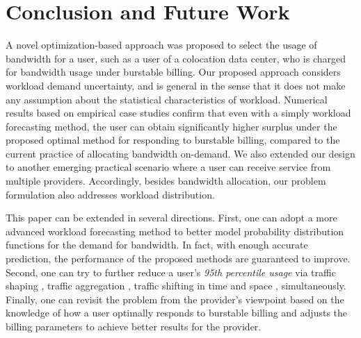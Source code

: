 \documentclass[10pt,journal,compsoc]{IEEEtran}
\begin{document}
\section{Conclusion and Future Work}\label{sec:conclusion}
A novel optimization-based approach was proposed to select the usage of bandwidth for a user, such as a user of a colocation data center, who is charged for bandwidth usage under burstable billing. Our proposed approach considers workload demand uncertainty, and is general in the sense that it does not make any assumption about the statistical characteristics of workload.
Numerical results based on empirical case studies confirm that even with a simply workload forecasting method, the user can obtain significantly higher surplus under the proposed optimal method for responding to burstable billing, compared to the current practice of allocating bandwidth on-demand. We also extended our design to another emerging practical scenario where a user can receive service from multiple providers. Accordingly, besides bandwidth allocation, our problem formulation also addresses workload distribution.

This paper can be extended in several directions. First, one can adopt a more advanced workload forecasting method to better model probability distribution functions for the demand for bandwidth. In fact, with enough accurate prediction, the performance of the proposed methods are guaranteed to improve. Second, one can try to further reduce a user's \emph{95th percentile usage} via traffic shaping \cite{Marcon2011}, traffic aggregation \cite{Stanojevic2011}, traffic shifting in time and space \cite{Clegg2014}, simultaneously. Finally, one can revisit the problem from the provider's viewpoint based on the knowledge of how a user optimally responds to burstable billing and adjusts the billing parameters to achieve better results for the provider.

























\appendices
\end{document}
